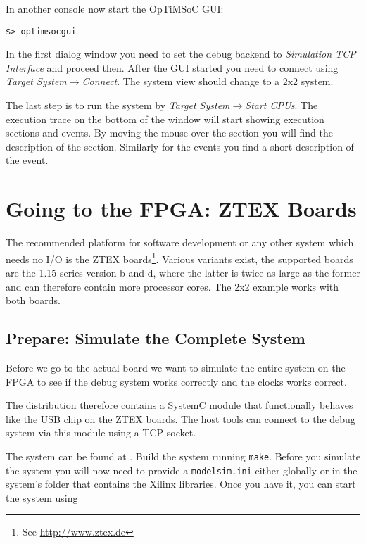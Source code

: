 In another console now start the OpTiMSoC GUI:

\begin{lstlisting}
$> optimsocgui
\end{lstlisting}

In the first dialog window you need to set the debug backend to
\emph{Simulation TCP Interface} and proceed then. After the GUI
started you need to connect using \emph{Target
  System}$\rightarrow$\emph{Connect}. The system view should change to
a 2x2 system.

The last step is to run the system by \emph{Target
  System}$\rightarrow$\emph{Start CPUs}. The execution trace on the
bottom of the window will start showing execution sections and events.
By moving the mouse over the section you will find the description of
the section. Similarly for the events you find a short description of
the event.

\section{Going to the FPGA: ZTEX Boards}

The recommended platform for software development or any other system
which needs no I/O is the ZTEX boards\footnote{See
  \url{http://www.ztex.de}}. Various variants exist, the supported boards
are the 1.15 series version b and d, where the latter is twice as
large as the former and can therefore contain more processor cores.
The 2x2 example works with both boards.

\subsection{Prepare: Simulate the Complete System}
\label{subsection:2x2_ztex_simulate_complete_system}

Before we go to the actual board we want to simulate the entire system
on the FPGA to see if the debug system works correctly and the
clocks works correct.

The distribution therefore contains a SystemC module that functionally
behaves like the USB chip on the ZTEX boards. The host tools can
connect to the debug system via this module using a TCP socket.

The system can be found at .
Build the system running \verb|make|. Before you simulate the system
you will now need to provide a \verb|modelsim.ini| either globally or
in the system's folder that contains the Xilinx libraries. Once you
have it, you can start the system using

